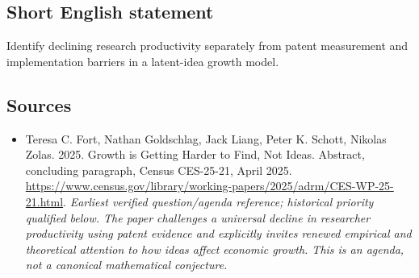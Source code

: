 \documentclass[11pt]{article}
\begin{document}
\subsection{Short English statement}
Identify declining research productivity separately from patent measurement and implementation barriers in a latent-idea growth model.

\subsection{Sources}
\begin{itemize}\raggedright
\item[\textnormal{[S1]}]\hypertarget{source:30007542:1}{} Teresa C. Fort, Nathan Goldschlag, Jack Liang, Peter K. Schott, Nikolas Zolas. 2025. Growth is Getting Harder to Find, Not Ideas. Abstract, concluding paragraph, Census CES-25-21, April 2025.
\url{https://www.census.gov/library/working-papers/2025/adrm/CES-WP-25-21.html}.
{\small\textit{Earliest verified question/agenda reference; historical priority qualified below. The paper challenges a universal decline in researcher productivity using patent evidence and explicitly invites renewed empirical and theoretical attention to how ideas affect economic growth. This is an agenda, not a canonical mathematical conjecture.}}
\end{itemize}
\end{document}
